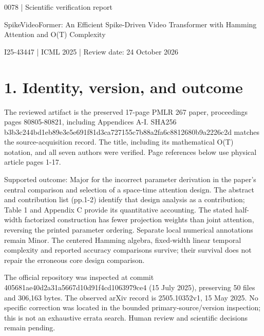 \documentclass[10pt]{article}
\begin{document}
0078 | Scientific verification report\par
SpikeVideoFormer: An Efficient Spike-Driven Video Transformer with Hamming Attention and O(T) Complexity\par
I25-43447 | ICML 2025 | Review date: 24 October 2026\par
\section*{1. Identity, version, and outcome}
The reviewed artifact is the preserved 17-page PMLR 267 paper, proceedings pages 80805-80821, including Appendices A-I. SHA256 b3b3c244bd1eb89e3e5e691f81d3ca727155c7b88a2fa6c8812680b9a2226c2d matches the source-acquisition record. The title, including its mathematical O(T) notation, and all seven authors were verified. Page references below use physical article pages 1-17.\par
Supported outcome: Major for the incorrect parameter derivation in the paper’s central comparison and selection of a space-time attention design. The abstract and contribution list (pp.1-2) identify that design analysis as a contribution; Table 1 and Appendix C provide its quantitative accounting. The stated half-width factorized construction has fewer projection weights than joint attention, reversing the printed parameter ordering. Separate local numerical annotations remain Minor. The centered Hamming algebra, fixed-width linear temporal complexity and reported accuracy comparisons survive; their survival does not repair the erroneous core design comparison.\par
The official repository was inspected at commit 405681ae40d2a31a5667d10d91f4cd1063979ce4 (15 July 2025), preserving 50 files and 306,163 bytes. The observed arXiv record is 2505.10352v1, 15 May 2025. No specific correction was located in the bounded primary-source/version inspection; this is not an exhaustive errata search. Human review and scientific decisions remain pending.\par
\end{document}
